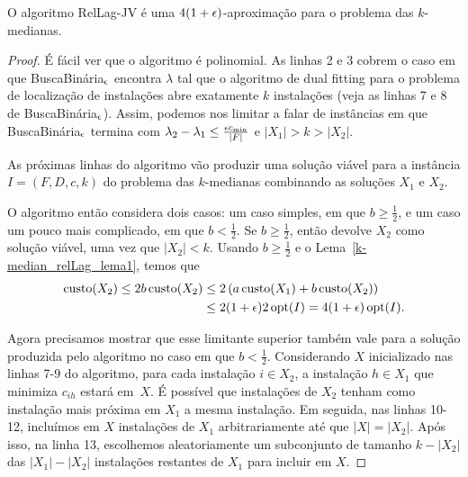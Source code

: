 \begin{lemma}
    O algoritmo {\sc RelLag-JV} é uma $4(1 + \epsilon)$-aproximação para o problema das $k$-medianas.
\end{lemma}
\begin{proof}

É fácil ver que o algoritmo é polinomial. As linhas 2 e 3 cobrem o caso em que {\sc BuscaBinária$_\epsilon$} encontra $\lambda$ tal que o algoritmo de dual fitting para o problema de localização de instalações abre exatamente $k$ instalações (veja as linhas 7 e 8 de {\sc BuscaBinária$_\epsilon$}). Assim, podemos nos limitar a falar de instâncias em que {\sc BuscaBinária$_\epsilon$} termina com $\lambda_2 - \lambda_1 \leq \frac{\epsilon c_\text{min}}{|F|}$ e $|X_1| > k > |X_2|$.

As próximas linhas do algoritmo vão produzir uma solução viável para a instância $I = (F,D,c,k)$ do problema das $k$-medianas combinando as soluções $X_1$ e $X_2$.

O algoritmo então considera dois casos: um caso simples, em que $b \geq \frac{1}{2}$, e um caso um pouco mais complicado, em que $b < \frac{1}{2}$. Se $b \geq \frac{1}{2}$, então devolve $X_2$ como solução viável, uma vez que $|X_2| < k$. Usando $b \geq \frac{1}{2}$ e o Lema~\ref{k-median_relLag_lema1}, temos que
\begin{subequations}
    \begin{align*}
        \mathrm{custo}(X_2) \leq 2b\,\mathrm{custo}(X_2) &\leq 2\left(a\,\mathrm{custo}(X_1) + b\,\mathrm{custo}(X_2) \right) \\
        &\leq 2(1+\epsilon) 2\, \mathrm{opt}(I) = 4(1+\epsilon)\, \mathrm{opt}(I).
    \end{align*}
\end{subequations}

Agora precisamos mostrar que esse limitante superior também vale para a solução produzida pelo algoritmo no caso em que $ b < \frac{1}{2}$. Considerando $X$ inicializado nas linhas 7-9 do algoritmo, para cada instalação $i \in X_2$, a instalação $h \in X_1$ que minimiza $c_{ih}$ estará em~$X$. É possível que instalações de $X_2$ tenham como instalação mais próxima em $X_1$ a mesma instalação. Em seguida, nas linhas 10-12, incluímos em $X$ instalações de $X_1$ arbitrariamente até que $|X| = |X_2|$. Após isso, na linha 13, escolhemos aleatoriamente um subconjunto de tamanho $k - |X_2|$ das $|X_1| - |X_2|$ instalações restantes de $X_1$ para incluir em $X$. 


\end{proof}
